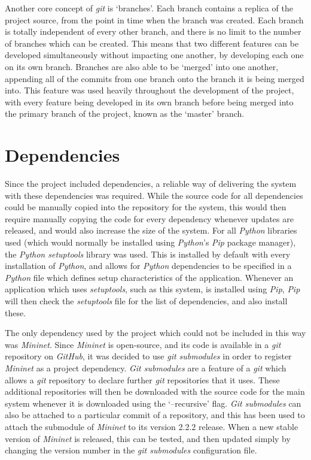 Another core concept of \textit{git} is `branches'.
Each branch contains a replica of the project source, from the point in time when the branch was created.
Each branch is totally independent of every other branch, and there is no limit to the number of branches which can be created.
This means that two different features can be developed simultaneously without impacting one another, by developing each one on its own branch.
Branches are also able to be `merged' into one another, appending all of the commits from one branch onto the branch it is being merged into.
This feature was used heavily throughout the development of the project, with every feature being developed in its own branch before being merged into the primary branch of the project, known as the `master' branch.

\section{Dependencies}
\label{dependencies}

Since the project included dependencies, a reliable way of delivering the system with these dependencies was required.
While the source code for all dependencies could be manually copied into the repository for the system, this would then require manually copying the code for every dependency whenever updates are released, and would also increase the size of the system.
For all \textit{Python} libraries used (which would normally be installed using \textit{Python}'s \textit{Pip} package manager), the \textit{Python setuptools} \cite{python_setuptools} library was used.
This is installed by default with every installation of \textit{Python}, and allows for \textit{Python} dependencies to be specified in a \textit{Python} file which defines setup characteristics of the application.
Whenever an application which uses \textit{setuptools}, such as this system, is installed using \textit{Pip}, \textit{Pip} will then check the \textit{setuptools} file for the list of dependencies, and also install these.

The only dependency used by the project which could not be included in this way was \textit{Mininet}.
Since \textit{Mininet} is open-source, and its code is available in a \textit{git} repository on \textit{GitHub}, it was decided to use \textit{git submodules} in order to register \textit{Mininet} as a project dependency.
\textit{Git submodules} are a feature of a \textit{git} which allows a \textit{git} repository to declare further \textit{git} repositories that it uses.
These additional repositories will then be downloaded with the source code for the main system whenever it is downloaded using the `--recursive' flag.
\textit{Git submodules} can also be attached to a particular commit of a repository, and this has been used to attach the submodule of \textit{Mininet} to its version 2.2.2 release.
When a new stable version of \textit{Mininet} is released, this can be tested, and then updated simply by changing the version number in the \textit{git submodules} configuration file.
